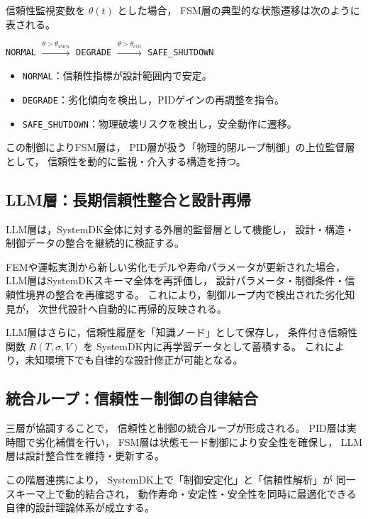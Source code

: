 信頼性監視変数を $\theta(t)$ とした場合，
FSM層の典型的な状態遷移は次のように表される。
\begin{center}
\texttt{NORMAL}
$\xrightarrow{\theta > \theta_{warn}}$
\texttt{DEGRADE}
$\xrightarrow{\theta > \theta_{crit}}$
\texttt{SAFE\_SHUTDOWN}
\end{center}

\begin{itemize}
  \item \texttt{NORMAL}：信頼性指標が設計範囲内で安定。
  \item \texttt{DEGRADE}：劣化傾向を検出し，PIDゲインの再調整を指令。
  \item \texttt{SAFE\_SHUTDOWN}：物理破壊リスクを検出し，安全動作に遷移。
\end{itemize}

この制御によりFSM層は，
PID層が扱う「物理的閉ループ制御」の上位監督層として，
信頼性を動的に監視・介入する構造を持つ。

\subsection{LLM層：長期信頼性整合と設計再帰}
LLM層は，SystemDK全体に対する外層的監督層として機能し，
設計・構造・制御データの整合を継続的に検証する。

FEMや運転実測から新しい劣化モデルや寿命パラメータが更新された場合，
LLM層はSystemDKスキーマ全体を再評価し，
設計パラメータ・制御条件・信頼性境界の整合を再確認する。
これにより，制御ループ内で検出された劣化知見が，
次世代設計へ自動的に再帰的反映される。

LLM層はさらに，信頼性履歴を「知識ノード」として保存し，
条件付き信頼性関数 $R(T, \sigma, V)$ を
SystemDK内に再学習データとして蓄積する。
これにより，未知環境下でも自律的な設計修正が可能となる。

\subsection{統合ループ：信頼性－制御の自律結合}
三層が協調することで，
信頼性と制御の統合ループが形成される。
PID層は実時間で劣化補償を行い，
FSM層は状態モード制御により安全性を確保し，
LLM層は設計整合性を維持・更新する。

この階層連携により，
SystemDK上で「制御安定化」と「信頼性解析」が
同一スキーマ上で動的結合され，
動作寿命・安定性・安全性を同時に最適化できる
自律的設計理論体系が成立する。
